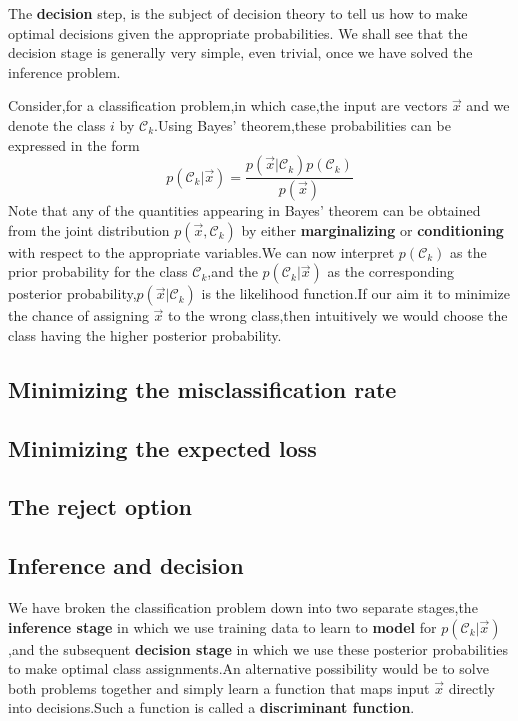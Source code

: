 The \textbf{decision} step, is the subject of decision theory to tell us how to make optimal decisions given the appropriate probabilities. We shall see that the decision stage is generally very simple, even trivial, once we have solved the inference problem.

Consider,for a classification problem,in which case,the input are vectors  $\vec{x}$ and we denote the class $i$ by $\mathcal{C}_k$.Using Bayes' theorem,these probabilities can be expressed in the form
\begin{equation}
p(\mathcal{C}_k|\vec{x}) = \dfrac{p(\vec{x}|\mathcal{C}_k)p(\mathcal{C}_k)}{p(\vec{x})}
\end{equation}
Note that any of the quantities appearing in Bayes' theorem can be obtained from the joint distribution $p(\vec{x},\mathcal{C}_k)$ by either \textbf{marginalizing} or \textbf{conditioning} with respect to the appropriate variables.We can now interpret $p(\mathcal{C}_k)$ as the prior probability for the class $\mathcal{C}_k$,and the $p(\mathcal{C}_k|\vec{x})$ as the corresponding posterior probability,$p(\vec{x}|\mathcal{C}_k)$ is the likelihood function.If our aim it to minimize the chance of assigning $\vec{x}$ to the wrong class,then intuitively we would choose the class having the higher posterior probability.
\subsection{Minimizing the misclassification rate}
\subsection{Minimizing the expected loss}
\subsection{The reject option}
\subsection{Inference and decision}
We have broken the classification problem down into two separate stages,the \textbf{inference stage} in which we use training data to learn to \textbf{model} for $p(\mathcal{C}_k|\vec{x})$,and the subsequent \textbf{decision stage} in which we use these posterior probabilities to make optimal class assignments.An alternative  possibility would be to solve both problems together and simply learn a function that maps input $\vec{x}$ directly into decisions.Such a function is called a \textbf{discriminant function}.

